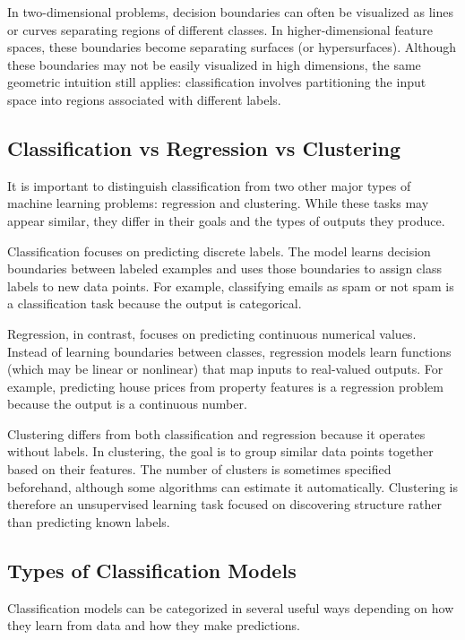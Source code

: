 \documentclass{article}
\begin{document}
In two-dimensional problems, decision boundaries can often be visualized as lines or curves separating regions of different classes. In higher-dimensional feature spaces, these boundaries become separating surfaces (or hypersurfaces). Although these boundaries may not be easily visualized in high dimensions, the same geometric intuition still applies: classification involves partitioning the input space into regions associated with different labels.

\subsection{Classification vs Regression vs Clustering}

It is important to distinguish classification from two other major types of machine learning problems: regression and clustering. While these tasks may appear similar, they differ in their goals and the types of outputs they produce.

Classification focuses on predicting discrete labels. The model learns decision boundaries between labeled examples and uses those boundaries to assign class labels to new data points. For example, classifying emails as spam or not spam is a classification task because the output is categorical.

Regression, in contrast, focuses on predicting continuous numerical values. Instead of learning boundaries between classes, regression models learn functions (which may be linear or nonlinear) that map inputs to real-valued outputs. For example, predicting house prices from property features is a regression problem because the output is a continuous number.

Clustering differs from both classification and regression because it operates without labels. In clustering, the goal is to group similar data points together based on their features. The number of clusters is sometimes specified beforehand, although some algorithms can estimate it automatically. Clustering is therefore an unsupervised learning task focused on discovering structure rather than predicting known labels.

\subsection{Types of Classification Models}

Classification models can be categorized in several useful ways depending on how they learn from data and how they make predictions.
\end{document}
